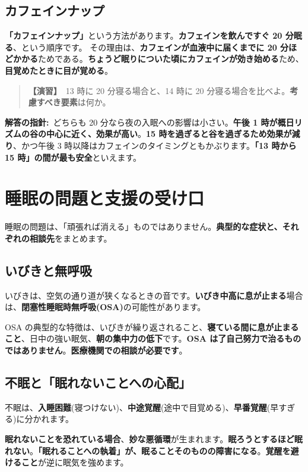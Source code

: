 \documentclass{article}
\begin{document}
\subsection{カフェインナップ}

\textbf{「カフェインナップ」}という方法があります。\textbf{カフェインを飲んですぐ 20 分眠る}、という順序です。
その理由は、\textbf{カフェインが血液中に届くまでに 20 分ほどかかる}ためである。\textbf{ちょうど眠りについた頃にカフェインが効き始める}ため、\textbf{目覚めたときに目が覚める}。

\begin{quote}
\textbf{【演習】}\ 13 時に 20 分寝る場合と、14 時に 20 分寝る場合を比べよ。\textbf{考慮すべき要素}は何か。
\end{quote}

\textbf{解答の指針:}\ どちらも 20 分なら夜の入眠への影響は小さい。\textbf{午後 1 時が概日リズムの谷の中心に近く、効果が高い}。\textbf{15 時を過ぎると谷を過ぎるため効果が減り}、かつ午後 3 時以降はカフェインのタイミングともかぶります。\textbf{「13 時から 15 時」の間が最も安全}といえます。

\section{睡眠の問題と支援の受け口}

睡眠の問題は、「頑張れば消える」ものではありません。\textbf{典型的な症状と、それぞれの相談先}をまとめます。

\subsection{いびきと無呼吸}

いびきは、空気の通り道が狭くなるときの音です。\textbf{いびき中高に息が止まる}場合は、\textbf{閉塞性睡眠時無呼吸(OSA)}の可能性があります。

OSA の典型的な特徴は、いびきが繰り返されること、\textbf{寝ている間に息が止まること}、日中の強い眠気、\textbf{朝の集中力の低下}です。\textbf{OSA は了自己努力で治るものではありません}。\textbf{医療機関での相談が必要です}。

\subsection{不眠と「眠れないことへの心配」}

不眠は、\textbf{入睡困難}(寝つけない)、\textbf{中途覚醒}(途中で目覚める)、\textbf{早番覚醒}(早すぎる)に分かれます。

\textbf{眠れないことを恐れている場合}、\textbf{妙な悪循環}が生まれます。\textbf{眠ろうとするほど眠れない}。\textbf{「眠れることへの執着」が、眠ることそのものの障害になる}。\textbf{覚醒を避けること}が逆に眠気を強めます。
\end{document}
